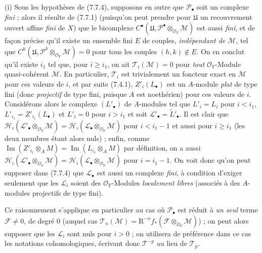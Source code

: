 \begin{remarks}[7.7.12]
\textnormal{(i)} Sous les hypothèses de (7.7.4), supposons en outre que
$\mathscr P_\bullet$ soit un complexe \emph{fini} ; alors il résulte de (7.7.1)
(puisqu'on peut prendre pour $\mathfrak U$ un recouvrement ouvert affine
\emph{fini} de $X$) que le bicomplexe
$C^\bullet(\mathfrak U,\mathscr P^\bullet\otimes_{\mathscr O_Y}\mathscr M)$ est
aussi \emph{fini}, et de façon précise qu'il existe un ensemble fini $E$ de couples,
\emph{indépendant de $\mathscr M$}, tel que
$C^h(\mathfrak U,\mathscr P^k\otimes_{\mathscr O_Y}\mathscr M)=0$ pour tous les couples $(h,k)\notin E$.
On en conclut qu'il existe $i_1$ tel que, pour $i\geq i_1$, on ait
$\mathscr T_i(\mathscr M)=0$ pour \emph{tout} $\mathscr O_Y$-Module
quasi-cohérent $\mathscr M$. En particulier, $\mathscr T_i$ est trivialement un
foncteur exact en $\mathscr M$ pour ces valeurs de $i$, et par suite (7.4.1),
$Z'_i(L_\bullet)$ est un $A$-module \emph{plat} de type fini (donc
\emph{projectif} de type fini, puisque $A$ est noethérien) pour ces valeurs de
$i$. Considérons alors le complexe $(L'_\bullet)$ de $A$-modules tel que
$L'_i=L_i$ pour $i<i_1$, $L'_{i_1}=Z'_{i_1}(L_\bullet)$ et $L'_i=0$ pour
$i>i_1$ et soit $\mathscr L'_\bullet=\widetilde{L}'_\bullet$. Il est clair que
$  \mathscr H_i(\mathscr L'_\bullet\otimes_{\mathscr O_Y}\mathscr M)
  =
  \mathscr H_i(\mathscr L_\bullet\otimes_{\mathscr O_Y}\mathscr M)$
pour $i<i_1-1$ et aussi pour $i\geq i_1$ (les deux membres étant alors nuls) ;
enfin, comme
$\operatorname{Im}(Z'_{i_1}\otimes_A M)=\operatorname{Im}(L_{i_1}\otimes_A M)$
par définition, on a aussi
$\mathscr H_i(\mathscr L'_\bullet\otimes_{\mathscr O_Y}\mathscr M)
=\mathscr H_i(\mathscr L_\bullet\otimes_{\mathscr O_Y}\mathscr M)$ pour
$i=i_1-1$. On voit donc qu'on peut supposer dans (7.7.4) que
$\mathscr L_\bullet$ est aussi un complexe \emph{fini}, à condition d'exiger
seulement que les $\mathscr L_i$ soient des $\mathscr O_Y$-Modules
\emph{localement libres} (associés à des $A$-modules projectifs de type fini).

Ce raisonnement s'applique en particulier au cas où $\mathscr P_\bullet$ est
réduit à \emph{un seul} terme $\mathscr F\ne0$, de degré 0 (auquel cas
$\mathscr T_n(\mathscr M)=\mathrm R^{-n}f_*
(\mathscr F\otimes_{\mathscr O_Y}\mathscr M)$) ; on peut alors supposer que les
$\mathscr L_i$ sont nuls pour $i>0$ ; on utilisera de préférence dans ce cas les
notations cohomologiques, écrivant donc $\mathscr T^{-p}$ au lieu de
$\mathscr T_p$.


\end{remarks}
